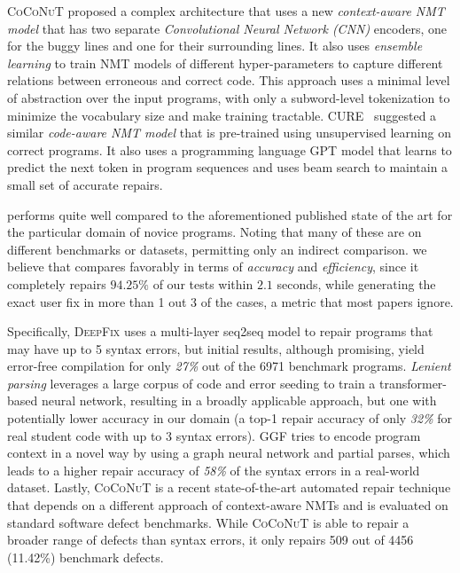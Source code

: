 %
\textsc{CoCoNuT} \citep{Lutellier2020} proposed a complex architecture that uses
a new \emph{context-aware NMT model} that has two separate \emph{Convolutional
Neural Network (CNN)} encoders, one for the buggy lines and one for their
surrounding lines. It also uses \emph{ensemble learning} to train NMT models of
different hyper-parameters to capture different relations between erroneous and
correct code. This approach uses a minimal level of abstraction over the input
programs, with only a subword-level tokenization to minimize the vocabulary size
and make training tractable.
%
\textsc{CURE}~\citep{Jiang_2021} suggested a similar \emph{code-aware NMT model}
that is pre-trained using unsupervised learning on correct programs. It also
uses a programming language \textsc{GPT} \citep{GPT2020} model that learns to
predict the next token in program sequences and uses beam search to maintain a
small set of accurate repairs.

\toolname performs quite well compared to the aforementioned published state of
the art for the particular domain of novice programs. Noting that many of these
are on different benchmarks or datasets, permitting only an indirect comparison.
we believe that \toolname compares favorably in terms of \emph{accuracy} and
\emph{efficiency}, since it completely repairs $94.25\%$ of our tests within
$2.1$ seconds, while generating the exact user fix in more than 1 out 3 of the
cases, a metric that most papers ignore.

Specifically, \textsc{DeepFix} \citep{Gupta2017} uses a multi-layer seq2seq
model to repair programs that may have up to 5 syntax errors, but initial
results, although promising, yield error-free compilation for only \emph{27\%}
out of the 6971 benchmark programs.
%
\emph{Lenient parsing} \citep{Ahmed_2021} leverages a large corpus of code and
error seeding to train a transformer-based neural network, resulting in a
broadly applicable approach, but one with potentially lower accuracy in our
domain (a top-1 repair accuracy of only \emph{32\%} for real student code with
up to 3 syntax errors).
%
\textsc{GGF} \citep{Wu2020} tries to encode program context in a novel way by
using a graph neural network and partial parses, which leads to a higher repair
accuracy of \emph{58\%} of the syntax errors in a real-world dataset.
%
Lastly, \textsc{CoCoNuT} \citep{Lutellier2020} is a recent state-of-the-art
automated repair technique that depends on a different approach of context-aware
NMTs and is evaluated on standard software defect benchmarks. While
\textsc{CoCoNuT} is able to repair a broader range of defects than syntax
errors, it only repairs 509 out of 4456 (11.42\%) benchmark defects.
